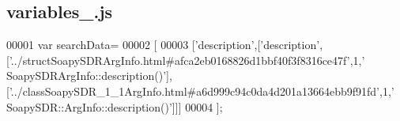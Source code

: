 \subsection{variables\+\_.\+js}
\label{variables__0_8js_source}

\begin{DoxyCode}
00001 var searchData=
00002 [
00003   [\textcolor{stringliteral}{'description'},[\textcolor{stringliteral}{'description'},[\textcolor{stringliteral}{'../structSoapySDRArgInfo.html#afca2eb0168826d1bbf40f3f8316ce47f'},1,\textcolor{stringliteral}{'
      SoapySDRArgInfo::description()'}],[\textcolor{stringliteral}{'../classSoapySDR\_1\_1ArgInfo.html#a6d999c94c0da4d201a13664ebb9f91fd'},1,\textcolor{stringliteral}{'
      SoapySDR::ArgInfo::description()'}]]]
00004 ];
\end{DoxyCode}
